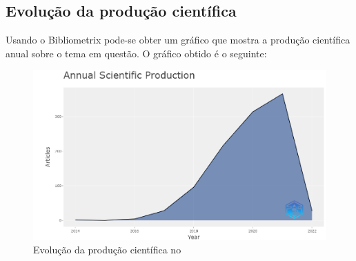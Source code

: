 \subsection{Evolução da produção científica}

Usando o Bibliometrix pode-se obter um gráfico que mostra a produção científica anual sobre o tema em questão. O gráfico obtido é o seguinte:


\begin{figure}[H]
    \centering
    \includegraphics[width=1\textwidth]{experiments/brunoedcf/AnaliseBibliometrica/BlockchainInHealth/Figures/AnualCientProd.png}
    \caption{Evolução da produção científica no \dataset}
\end{figure}

